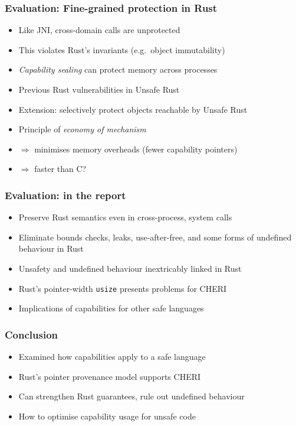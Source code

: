 \documentclass{beamer}
\begin{document}
\begin{frame}
\frametitle{Evaluation: Fine-grained protection in Rust}

\begin{itemize}
    \item Like JNI, cross-domain calls are unprotected
    \item This violates Rust's invariants (e.g.\ object immutability)
    \item \emph{Capability sealing} can protect memory across processes
    \item Previous Rust vulnerabilities in Unsafe Rust
    \item Extension: selectively protect objects reachable by Unsafe Rust
    \item Principle of \emph{economy of mechanism}
    \item \(\Rightarrow\) minimises memory overheads (fewer capability pointers)
    \item \(\Rightarrow\) faster than C?
\end{itemize}
\end{frame}


\begin{frame}
\frametitle{Evaluation: in the report}

\begin{itemize}
    \item Preserve Rust semantics even in cross-process, system calls
    \item Eliminate bounds checks, leaks, use-after-free, and some forms
    of undefined behaviour in Rust
    \item Unsafety and undefined behaviour inextricably linked in Rust
    \item Rust's pointer-width \texttt{usize} presents problems for CHERI
    \item Implications of capabilities for other safe languages
\end{itemize}
\end{frame}


\begin{frame}
\frametitle{Conclusion}

\begin{itemize}
    \item Examined how capabilities apply to a safe language
    \item Rust's pointer provenance model supports CHERI
    \item Can strengthen Rust guarantees, rule out undefined behaviour
    \item How to optimise capability usage for unsafe code
\end{itemize}
\end{frame}
\end{document}
